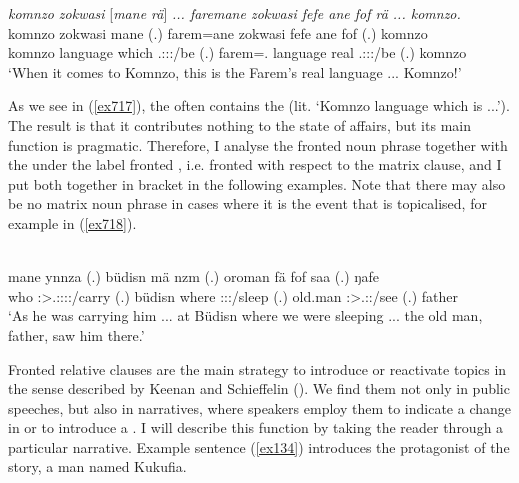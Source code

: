 \begin{exe}
	\ex \emph{komnzo zokwasi} [\emph{mane rä}] \emph{... faremane zokwasi fefe ane fof rä ... komnzo.}\\
	\gll komnzo zokwasi mane  (.) farem=ane zokwasi fefe ane fof  (.) komnzo\\
	komnzo language which \Tsg.\F:\Sbj:\Nonpast:\Ipfv/be (.) farem=\Poss.{\Sg} language real {\Dem} {\Emph} \Tsg.\F:\Sbj:\Nonpast:\Ipfv/be (.) komnzo\\
	\trans `When it comes to Komnzo, this is the Farem's real language ... Komnzo!'\\
	\label{ex717}
\end{exe}

As we see in (\ref{ex717}), the  often contains the  (lit. `Komnzo language which is ...'). The result is that it contributes nothing to the state of affairs, but its main function is pragmatic. Therefore, I analyse the fronted noun phrase together with the  under the label fronted , i.e. fronted with respect to the matrix clause, and I put both together in bracket in the following examples. Note that there may also be no matrix noun phrase in cases where it is the event that is topicalised, for example in (\ref{ex718}).

\begin{exe}
	\\
	\gll mane ynnza (.) büdisn mä nzm (.) oroman fä fof saa (.) ŋafe\\
	who \Sg:\Sbj>\Tsg.\Masc:\Obj:\Pst:\Ipfv:\Venit/carry (.) büdisn where \Fpl:\Sbj:\Pst:\Dur/sleep (.) old.man {\Dist} {\Emph} \Sg:\Sbj>\Tsg.\Masc:\Pst:\Ipfv/see (.) father\\
	\trans `As he was carrying him ... at Büdisn where we were sleeping ... the old man, father, saw him there.'
	\label{ex718}
\end{exe}

Fronted relative clauses are the main strategy to introduce or reactivate topics in the sense described by Keenan and Schieffelin (\citeyear[342]{Keenan:1976wo}). We find them not only in public speeches, but also in narratives, where speakers employ them to indicate a change in  or to introduce a . I will describe this function by taking the reader through a particular narrative. Example sentence (\ref{ex134}) introduces the protagonist of the story, a man named Kukufia.

